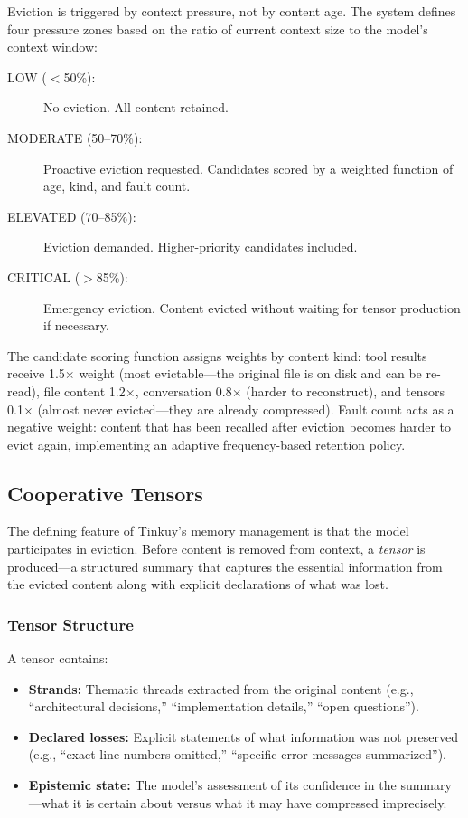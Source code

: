 \documentclass[sigplan,screen,anonymous]{acmart}
\begin{document}
Eviction is triggered by context pressure, not by content age. The
system defines four pressure zones based on the ratio of current
context size to the model's context window:

\begin{description}
\item[LOW ($<$50\%):] No eviction. All content retained.
\item[MODERATE (50--70\%):] Proactive eviction requested. Candidates
  scored by a weighted function of age, kind, and fault count.
\item[ELEVATED (70--85\%):] Eviction demanded. Higher-priority
  candidates included.
\item[CRITICAL ($>$85\%):] Emergency eviction. Content evicted
  without waiting for tensor production if necessary.
\end{description}

The candidate scoring function assigns weights by content kind: tool
results receive 1.5$\times$ weight (most evictable---the original
file is on disk and can be re-read), file content 1.2$\times$,
conversation 0.8$\times$ (harder to reconstruct), and tensors
0.1$\times$ (almost never evicted---they are already compressed).
Fault count acts as a negative weight: content that has been recalled
after eviction becomes harder to evict again, implementing an adaptive
frequency-based retention policy.

\subsection{Cooperative Tensors}
\label{sec:tensors}

The defining feature of Tinkuy's memory management is that the model
participates in eviction. Before content is removed from context, a
\emph{tensor} is produced---a structured summary that captures the
essential information from the evicted content along with explicit
declarations of what was lost.

\subsubsection{Tensor Structure}

A tensor contains:
\begin{itemize}
\item \textbf{Strands:} Thematic threads extracted from the original
  content (e.g., ``architectural decisions,'' ``implementation
  details,'' ``open questions'').
\item \textbf{Declared losses:} Explicit statements of what
  information was not preserved (e.g., ``exact line numbers omitted,''
  ``specific error messages summarized'').
\item \textbf{Epistemic state:} The model's assessment of its
  confidence in the summary---what it is certain about versus what it
  may have compressed imprecisely.
\end{itemize}
\end{document}
